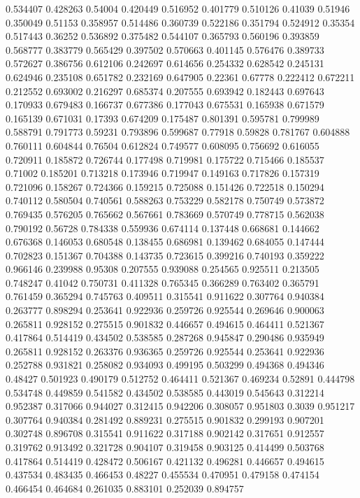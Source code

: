 0.534407 0.428263
0.54004 0.420449
0.516952 0.401779
0.510126 0.41039
0.51946 0.350049
0.51153 0.358957
0.514486 0.360739
0.522186 0.351794
0.524912 0.35354
0.517443 0.36252
0.536892 0.375482
0.544107 0.365793
0.560196 0.393859
0.568777 0.383779
0.565429 0.397502
0.570663 0.401145
0.576476 0.389733
0.572627 0.386756
0.612106 0.242697
0.614656 0.254332
0.628542 0.245131
0.624946 0.235108
0.651782 0.232169
0.647905 0.22361
0.67778 0.222412
0.672211 0.212552
0.693002 0.216297
0.685374 0.207555
0.693942 0.182443
0.697643 0.170933
0.679483 0.166737
0.677386 0.177043
0.675531 0.165938
0.671579 0.165139
0.671031 0.17393
0.674209 0.175487
0.801391 0.595781
0.799989 0.588791
0.791773 0.59231
0.793896 0.599687
0.77918 0.59828
0.781767 0.604888
0.760111 0.604844
0.76504 0.612824
0.749577 0.608095
0.756692 0.616055
0.720911 0.185872
0.726744 0.177498
0.719981 0.175722
0.715466 0.185537
0.71002 0.185201
0.713218 0.173946
0.719947 0.149163
0.717826 0.157319
0.721096 0.158267
0.724366 0.159215
0.725088 0.151426
0.722518 0.150294
0.740112 0.580504
0.740561 0.588263
0.753229 0.582178
0.750749 0.573872
0.769435 0.576205
0.765662 0.567661
0.783669 0.570749
0.778715 0.562038
0.790192 0.56728
0.784338 0.559936
0.674114 0.137448
0.668681 0.144662
0.676368 0.146053
0.680548 0.138455
0.686981 0.139462
0.684055 0.147444
0.702823 0.151367
0.704388 0.143735
0.723615 0.399216
0.740193 0.359222
0.966146 0.239988
0.95308 0.207555
0.939088 0.254565
0.925511 0.213505
0.748247 0.41042
0.750731 0.411328
0.765345 0.366289
0.763402 0.365791
0.761459 0.365294
0.745763 0.409511
0.315541 0.911622
0.307764 0.940384
0.263777 0.898294
0.253641 0.922936
0.259726 0.925544
0.269646 0.900063
0.265811 0.928152
0.275515 0.901832
0.446657 0.494615
0.464411 0.521367
0.417864 0.514419
0.434502 0.538585
0.287268 0.945847
0.290486 0.935949
0.265811 0.928152
0.263376 0.936365
0.259726 0.925544
0.253641 0.922936
0.252788 0.931821
0.258082 0.934093
0.499195 0.503299
0.494368 0.494346
0.48427 0.501923
0.490179 0.512752
0.464411 0.521367
0.469234 0.52891
0.444798 0.534748
0.449859 0.541582
0.434502 0.538585
0.443019 0.545643
0.312214 0.952387
0.317066 0.944027
0.312415 0.942206
0.308057 0.951803
0.3039 0.951217
0.307764 0.940384
0.281492 0.889231
0.275515 0.901832
0.299193 0.907201
0.302748 0.896708
0.315541 0.911622
0.317188 0.902142
0.317651 0.912557
0.319762 0.913492
0.321728 0.904107
0.319458 0.903125
0.414499 0.503768
0.417864 0.514419
0.428472 0.506167
0.421132 0.496281
0.446657 0.494615
0.437534 0.483435
0.466453 0.48227
0.455534 0.470951
0.479158 0.474154
0.466454 0.464684
0.261035 0.883101
0.252039 0.894757
